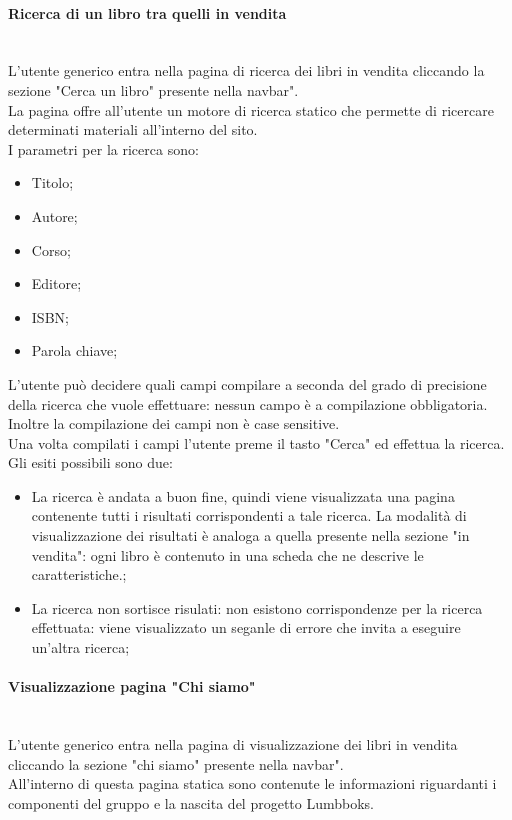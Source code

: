 \paragraph{Ricerca di un libro tra quelli in vendita}\mbox{}\\
\label{par:RicercaLibro}
L'utente generico entra nella pagina di ricerca dei libri in vendita cliccando la sezione "Cerca un libro" presente nella navbar".\\
La pagina offre all'utente un motore di ricerca statico che permette di ricercare determinati materiali all'interno del sito.\\
I parametri per la ricerca sono:
\begin{itemize}
	\item Titolo;
	\item Autore;
	\item Corso;
	\item Editore;
	\item ISBN;
	\item Parola chiave;
\end{itemize}
L'utente può decidere quali campi compilare a seconda del grado di precisione della ricerca che vuole effettuare: nessun campo è a compilazione obbligatoria. Inoltre la compilazione dei campi non è case sensitive.\\
Una volta compilati i campi l'utente preme il tasto "Cerca" ed effettua la ricerca. Gli esiti possibili sono due:
\begin{itemize}
	\item La ricerca è andata a buon fine, quindi viene visualizzata una pagina contenente tutti i risultati corrispondenti a tale ricerca. La modalità di visualizzazione dei risultati è analoga a quella presente nella sezione "in vendita": ogni libro è contenuto in una scheda che ne descrive le caratteristiche.;
	\item La ricerca non sortisce risulati: non esistono corrispondenze per la ricerca effettuata: viene visualizzato un seganle di errore che invita a eseguire un'altra ricerca;
	
\end{itemize}

\paragraph{Visualizzazione pagina "Chi siamo"}\mbox{}\\
\label{par:VisAbout}
L'utente generico entra nella pagina di visualizzazione dei libri in vendita cliccando la sezione "chi siamo" presente nella navbar".\\
All'interno di questa pagina statica sono contenute le informazioni riguardanti i componenti del gruppo e la nascita del progetto Lumbboks.

